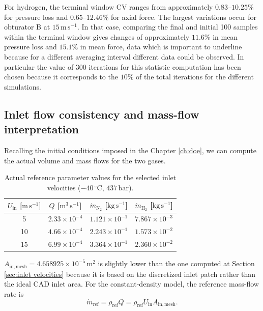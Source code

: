 For hydrogen, the terminal window CV ranges from approximately $0.83$--$10.25\%$ for pressure loss and $0.65$--$12.46\%$ for axial force. The largest variations occur for obturator B at $15\,\mathrm{m\,s^{-1}}$. In that case, comparing the final and initial 100 samples within the terminal window gives changes of approximately $11.6\%$ in mean pressure loss and $15.1\%$ in mean force, data which is important to underline because for a different averaging interval different data could be observed. In particular the value of 300 iterations for this statistic computation has been chosen because it corresponds to the $10\%$ of the total iterations for the different simulations.

\subsection{Inlet flow consistency and mass-flow interpretation}

Recalling the initial conditions imposed in the Chapter \ref{ch:doe}, we can compute the actual volume and mass flows for the two gases.

\begin{table}[htbp]
\centering
\small
\begin{tabular}{@{}cccc@{}}
\toprule
$U_{\mathrm{in}}$ [$\mathrm{m\,s^{-1}}$] &
$Q$ [$\mathrm{m^3\,s^{-1}}$] &
$\dot m_{\mathrm{N}_2}$ [$\mathrm{kg\,s^{-1}}$] &
$\dot m_{\mathrm{H}_2}$ [$\mathrm{kg\,s^{-1}}$]\\
\midrule
5  & $2.33\times10^{-4}$ & $1.121\times10^{-1}$ & $7.867\times10^{-3}$\\
10 & $4.66\times10^{-4}$ & $2.243\times10^{-1}$ & $1.573\times10^{-2}$\\
15 & $6.99\times10^{-4}$ & $3.364\times10^{-1}$ & $2.360\times10^{-2}$\\
\bottomrule
\end{tabular}
\caption{Actual reference parameter values for the selected inlet velocities ($-40\,^{\circ}\mathrm{C}$, $437\,\mathrm{bar}$).}
\label{tab:mass flows}

\end{table}

$A_{\mathrm{in,mesh}}=4.658925\times10^{-5}\,\mathrm{m^2}$ is slightly lower than the one computed at Section \ref{sec:inlet velocities} because it is based on the discretized inlet patch rather than the ideal CAD inlet area. For the constant-density model, the reference mass-flow rate is
\begin{equation}
\dot m_{\mathrm{ref}}=\rho_{\mathrm{ref}} Q
=\rho_{\mathrm{ref}}U_{\mathrm{in}}A_{\mathrm{in,mesh}}.
\label{eq:mass_flow_highp}
\end{equation}
 
